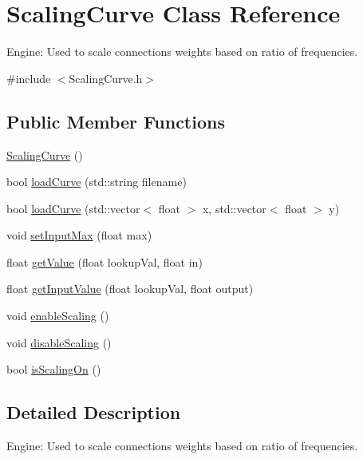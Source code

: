 \hypertarget{classScalingCurve}{}\section{Scaling\+Curve Class Reference}
\label{classScalingCurve}


Engine\+: Used to scale connections weights based on ratio of frequencies.  




{\ttfamily \#include $<$Scaling\+Curve.\+h$>$}

\subsection*{Public Member Functions}
\begin{DoxyCompactItemize}
\item 
\mbox{\hyperlink{classScalingCurve_ab0b52e98eecd1c1ce1ff888dc710ebbc}{Scaling\+Curve}} ()
\item 
bool \mbox{\hyperlink{classScalingCurve_af8657e5cc68d011c0ff6c7dba0fb6747}{load\+Curve}} (std\+::string filename)
\item 
bool \mbox{\hyperlink{classScalingCurve_a834725ff8c4c7763df12fb1c8a3010e1}{load\+Curve}} (std\+::vector$<$ float $>$ x, std\+::vector$<$ float $>$ y)
\item 
void \mbox{\hyperlink{classScalingCurve_a95c549a2017ba588478026e95c7198bd}{set\+Input\+Max}} (float max)
\item 
float \mbox{\hyperlink{classScalingCurve_a779ba1c1e433d8ab08eaabc4633927c8}{get\+Value}} (float lookup\+Val, float in)
\item 
float \mbox{\hyperlink{classScalingCurve_a3259fbbbbf323b36b899bc1a67896a5a}{get\+Input\+Value}} (float lookup\+Val, float output)
\item 
void \mbox{\hyperlink{classScalingCurve_a902a8b226db6f165874875d84cdefef5}{enable\+Scaling}} ()
\item 
void \mbox{\hyperlink{classScalingCurve_a688204d455d320f7ac5435c60e815772}{disable\+Scaling}} ()
\item 
bool \mbox{\hyperlink{classScalingCurve_aa76648ce8ad5f0cb1676ac251b17599f}{is\+Scaling\+On}} ()
\end{DoxyCompactItemize}


\subsection{Detailed Description}
Engine\+: Used to scale connections weights based on ratio of frequencies. 

